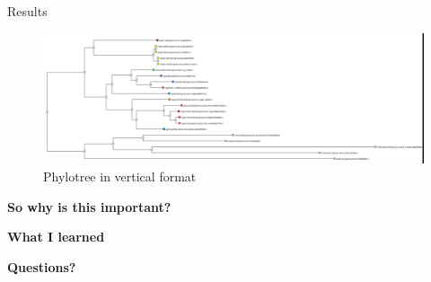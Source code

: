 \documentclass[aspectratio=169]{beamer}
\begin{document}
            \begin{frame}{Results}
		\begin{figure}
			\centering
			\includegraphics[width=0.6\linewidth]{imgs/vertical-lis-tree.png}
			\caption{Phylotree in vertical format}
		\end{figure}
		\end{frame}
  \begin{frame}
  \large{\bf{So why is this important?}}
  \end{frame}
  \begin{frame}
\large{\bf{{What I learned}}}
  \end{frame}
				\begin{frame}
			\large{\textbf{Questions?}}	
		\end{frame}
		
			
\end{document}
